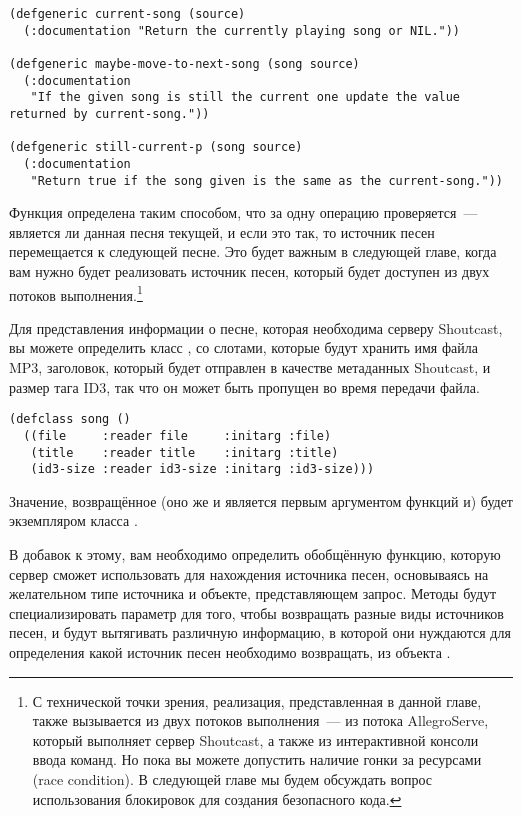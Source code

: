 \begin{lstlisting}
(defgeneric current-song (source)
  (:documentation "Return the currently playing song or NIL."))

(defgeneric maybe-move-to-next-song (song source)
  (:documentation
   "If the given song is still the current one update the value
returned by current-song."))

(defgeneric still-current-p (song source)
  (:documentation
   "Return true if the song given is the same as the current-song."))
\end{lstlisting}

Функция  определена таким способом, что за одну операцию
проверяется~--- является ли данная песня текущей, и если это так, то источник песен
перемещается к следующей песне.  Это будет важным в следующей главе, когда вам нужно будет
реализовать источник песен, который будет доступен из двух потоков выполнения.\footnote{С
  технической точки зрения, реализация, представленная в данной главе, также вызывается из
  двух потоков выполнения~--- из потока AllegroServe, который выполняет сервер Shoutcast, а
  также из интерактивной консоли ввода команд.  Но пока вы можете допустить наличие гонки
  за ресурсами (race condition).  В следующей главе мы будем обсуждать вопрос
  использования блокировок для создания безопасного кода.}

Для представления информации о песне, которая необходима серверу Shoutcast, вы можете
определить класс , со слотами, которые будут хранить имя файла MP3, заголовок,
который будет отправлен в качестве метаданных Shoutcast, и размер тага ID3, так что он
может быть пропущен во время передачи файла.

\begin{lstlisting}
(defclass song ()
  ((file     :reader file     :initarg :file)
   (title    :reader title    :initarg :title)
   (id3-size :reader id3-size :initarg :id3-size)))
\end{lstlisting}

Значение, возвращённое  (оно же и является первым аргументом функций
 и) будет экземпляром класса
.

В добавок к этому, вам необходимо определить обобщённую функцию, которую сервер сможет
использовать для нахождения источника песен, основываясь на желательном типе источника и
объекте, представляющем запрос.  Методы будут специализировать параметр  для
того, чтобы возвращать разные виды источников песен, и будут вытягивать различную
информацию, в которой они нуждаются для определения какой источник песен необходимо
возвращать, из объекта .

